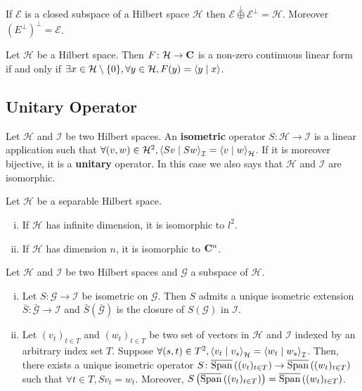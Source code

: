 	\begin{thm}
		If $\mathcal{E}$ is a closed subspace of a Hilbert space $\mathcal{H}$ then $\mathcal{E} \overset\perp\oplus \mathcal{E}^\perp = \mathcal{H}$.
		Moreover $\left( E^\perp \right)^\perp = \mathcal{E}$.
	\end{thm}
	
	\begin{thm}
		Let $\mathcal{H}$ be a Hilbert space.
		Then $F \colon \mathcal{H} \to \mathbf{C}$ is a non-zero continuous linear form if and only if $\exists x \in \mathcal{H} \setminus \{ 0 \}, \forall y \in \mathcal{H}, F(y) = \left\langle y \mid x \right\rangle$.
	\end{thm}

\subsection{Unitary Operator}

	\begin{defn}
		Let $\mathcal{H}$ and $\mathcal{I}$ be two Hilbert spaces.
		An \textbf{isometric} operator $S \colon \mathcal{H} \to \mathcal{I}$ is a linear application such that $\forall (v,w) \in \mathcal{H}^2, \left\langle Sv \mid Sw \right\rangle_{\mathcal{I}} = \left\langle v \mid w \right\rangle_{\mathcal{H}}$.
		If it is moreover bijective, it is a \textbf{unitary} operator.
		In this case we also says that $\mathcal{H}$ and $\mathcal{I}$ are isomorphic.
	\end{defn}
	
	\begin{thm}
		Let $\mathcal{H}$ be a separable Hilbert space.
		\begin{enumerate}[(i)]
			\item If $\mathcal{H}$ has infinite dimension, it is isomorphic to $l^2$.
			\item If $\mathcal{H}$ has dimension $n$, it is isomorphic to $\mathbf{C}^n$.
		\end{enumerate}
	\end{thm}
	
	\begin{thm}
		Let $\mathcal{H}$ and $\mathcal{I}$ be two Hilbert spaces and $\mathcal{G}$ a subspace of $\mathcal{H}$.
		\begin{enumerate}[(i)]
			\item Let $S \colon \mathcal{G} \to \mathcal{I}$ be isometric on $\mathcal{G}$.
				Then $S$ admits a unique isometric extension $\bar{S} \colon \bar{\mathcal{G}} \to \mathcal{I}$ and $\bar{S} \left( \bar{\mathcal{G}} \right)$ is the closure of $S(\mathcal{G})$ in $\mathcal{I}$.
			\item Let $(v_t)_{t \in T}$ and $(w_t)_{t \in T}$ be two set of vectors in $\mathcal{H}$ and $\mathcal{I}$ indexed by an arbitrary index set $T$.
				Suppose $\forall (s,t) \in T^2, \left\langle v_t \mid v_s \right\rangle_{\mathcal{H}} = \left\langle w_t \mid w_s \right\rangle_{\mathcal{I}}$.
				Then, there exists a unique isometric operator $S \colon \overline{\operatorname{Span}} \left( (v_t)_{t \in T} \right) \to \overline{\operatorname{Span}} \left( (w_t)_{t \in T} \right)$ such that $\forall t \in T, S v_t = w_t$.
				Moreover, $S \left( \overline{\operatorname{Span}} \left( (v_t)_{t \in T} \right) \right) = \overline{\operatorname{Span}} \left( (w_t)_{t \in T} \right)$.
		\end{enumerate}
	\end{thm}
